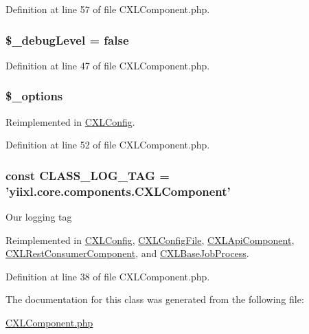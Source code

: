 Definition at line 57 of file CXLComponent.php.

\hypertarget{classCXLComponent_a6c76d7fa9253beae006eaaf4e3038ce9}{
\subsubsection[{\$\_\-debugLevel}]{\setlength{\rightskip}{0pt plus 5cm}\$\_\-debugLevel = false}}
\label{classCXLComponent_a6c76d7fa9253beae006eaaf4e3038ce9}


Definition at line 47 of file CXLComponent.php.

\hypertarget{classCXLComponent_a1bebdc689c84eee59ad24c77e5531762}{
\subsubsection[{\$\_\-options}]{\setlength{\rightskip}{0pt plus 5cm}\$\_\-options}}
\label{classCXLComponent_a1bebdc689c84eee59ad24c77e5531762}


Reimplemented in \hyperlink{classCXLConfig_a1bebdc689c84eee59ad24c77e5531762}{CXLConfig}.



Definition at line 52 of file CXLComponent.php.

\hypertarget{classCXLComponent_aa607ab5e557e6ebb60b85c5a20ad067f}{
\subsubsection[{CLASS\_\-LOG\_\-TAG}]{\setlength{\rightskip}{0pt plus 5cm}const {\bf CLASS\_\-LOG\_\-TAG} = 'yiixl.core.components.CXLComponent'}}
\label{classCXLComponent_aa607ab5e557e6ebb60b85c5a20ad067f}
Our logging tag 

Reimplemented in \hyperlink{classCXLConfig_aa607ab5e557e6ebb60b85c5a20ad067f}{CXLConfig}, \hyperlink{classCXLConfigFile_aa607ab5e557e6ebb60b85c5a20ad067f}{CXLConfigFile}, \hyperlink{classCXLApiComponent_aa607ab5e557e6ebb60b85c5a20ad067f}{CXLApiComponent}, \hyperlink{classCXLRestConsumerComponent_aa607ab5e557e6ebb60b85c5a20ad067f}{CXLRestConsumerComponent}, and \hyperlink{classCXLBaseJobProcess_aa607ab5e557e6ebb60b85c5a20ad067f}{CXLBaseJobProcess}.



Definition at line 38 of file CXLComponent.php.



The documentation for this class was generated from the following file:\begin{DoxyCompactItemize}
\item 
\hyperlink{CXLComponent_8php}{CXLComponent.php}\end{DoxyCompactItemize}

